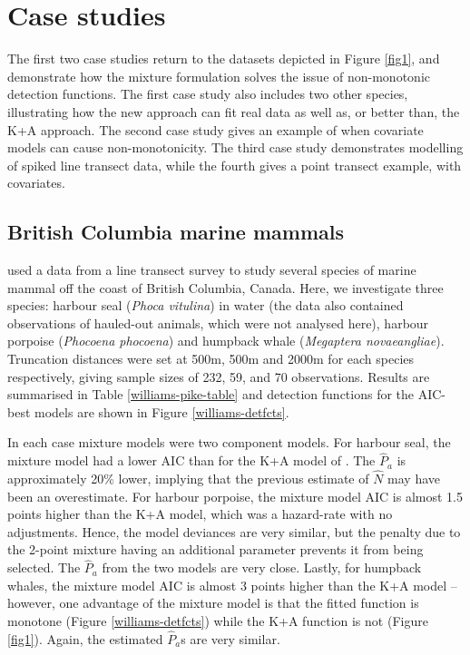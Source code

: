 \documentclass[authoryear,preprint,review,12pt]{elsarticle}
\begin{document}
\section{Case studies}
\label{s:data}

The first two case studies return to the datasets depicted in Figure \ref{fig1}, and demonstrate how the mixture formulation solves the issue of non-monotonic detection functions.  The first case study also includes two other species, illustrating how the new approach can fit real data as well as, or better than, the K+A approach. The second case study gives an example of when covariate models can cause non-monotonicity.  The third case study demonstrates modelling of spiked line transect data, while the fourth gives a point transect example, with covariates.

\subsection{British Columbia marine mammals}

\cite{Williams:2007tc} used a data from a line transect survey to study several species of marine mammal off the coast of British Columbia, Canada. Here, we investigate three species: harbour seal (\textit{Phoca vitulina}) in water (the data also contained observations of hauled-out animals, which were not analysed here), harbour porpoise (\textit{Phocoena phocoena}) and humpback whale (\textit{Megaptera novaeangliae}). Truncation distances were set at 500m, 500m and 2000m for each species respectively, giving sample sizes of 232, 59, and 70 observations. Results are summarised in Table \ref{williams-pike-table} and detection functions for the AIC-best models are shown in Figure \ref{williams-detfcts}.

In each case mixture models were two component models.  For harbour seal, the mixture model had a lower AIC than for the K+A model of \cite{Williams:2007tc}.  The $\hat{P}_a$ is approximately 20\% lower, implying that the previous estimate of $\hat{N}$ may have been an overestimate.  For harbour porpoise, the mixture model AIC is almost 1.5 points higher than the K+A model, which was a hazard-rate with no adjustments.  Hence, the model deviances are very similar, but the penalty due to the 2-point mixture having an additional parameter prevents it from being selected.  The $\hat{P}_a$ from the two models are very close.  Lastly, for humpback whales, the mixture model AIC is almost 3 points higher than the K+A model -- however, one advantage of the mixture model is that the fitted function is monotone (Figure \ref{williams-detfcts}) while the K+A function is not (Figure \ref{fig1}).  Again, the estimated $\hat{P}_a$s are very similar.
\end{document}
